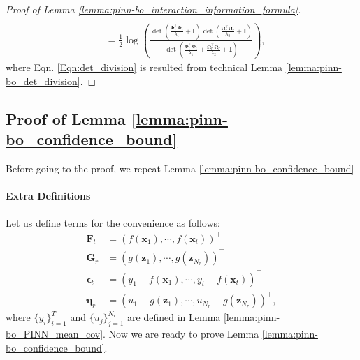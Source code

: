\begin{proof}[Proof of Lemma \ref{lemma:pinn-bo_interaction_information_formula}]
\begin{align}
\\ 
        & = \frac{1}{2}  \log \left(\frac{\det(\frac{\boldsymbol{\Phi}_t^\top \boldsymbol{\Phi}_t}{\lambda_1} + \mathbf{I})\det(\frac{\boldsymbol{\Omega}_r^\top \boldsymbol{\Omega}_r}{\lambda_2} + \mathbf{I})}{\det(\frac{\boldsymbol{\Phi}_t^\top \boldsymbol{\Phi}_t}{\lambda_1} + \frac{\boldsymbol{\Omega}_r^\top \boldsymbol{\Omega}_r}{\lambda_2} + \mathbf{I})} \right), \nonumber
\end{align}
where Eqn. \eqref{Eqn:det_division} is resulted from technical Lemma \ref{lemma:pinn-bo_det_division}. 
\end{proof}
\subsection{Proof of Lemma \ref{lemma:pinn-bo_confidence_bound}}
Before going to the proof, we repeat Lemma \ref{lemma:pinn-bo_confidence_bound}
\PINNBOConfidenceBound*





\paragraph{Extra Definitions}
Let us define terms for the convenience as follows:
\begin{align*}
     \mathbf{F}_t & = (f(\mathbf{x}_1), \cdots, f(\mathbf{x}_t))^\top 
     \\
      \mathbf{G}_r & = (g(\mathbf{z}_1), \cdots, g(\mathbf{z}_{N_r}))^\top \\
     \boldsymbol{\epsilon}_t & = (y_1 - f(\mathbf{x}_1), \cdots, y_t - f(\mathbf{x}_t))^\top \\
     \boldsymbol{\eta}_r & = (u_1 - g(\mathbf{z}_1), \cdots, u_{N_r} - g(\mathbf{z}_{N_r}))^\top,
\end{align*}
where $\{y_i\}_{i=1}^T$ and $\{u_j\}_{j=1}^{N_r}$ are defined in Lemma \ref{lemma:pinn-bo_PINN_mean_cov}. Now we are ready to prove Lemma \ref{lemma:pinn-bo_confidence_bound}.


